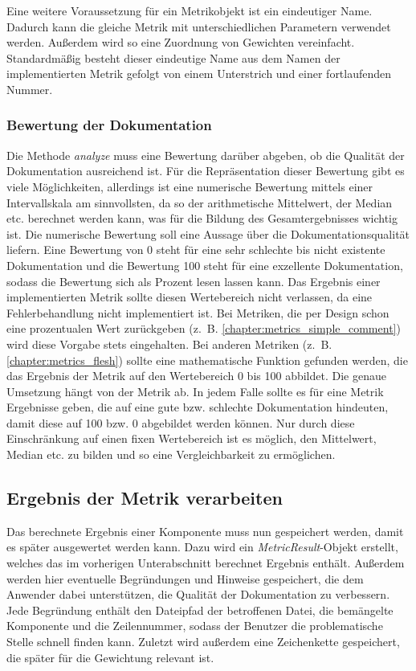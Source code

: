 Eine  weitere Voraussetzung für ein Metrikobjekt ist ein eindeutiger Name. Dadurch kann die gleiche Metrik mit unterschiedlichen Parametern verwendet werden. Außerdem wird so eine Zuordnung von Gewichten vereinfacht. Standardmäßig besteht dieser eindeutige Name aus dem Namen der implementierten Metrik gefolgt von einem Unterstrich und einer fortlaufenden Nummer.
\subsubsection{Bewertung der Dokumentation}
Die Methode \textit{analyze} muss eine Bewertung darüber abgeben, ob die Qualität der Dokumentation ausreichend ist. Für die Repräsentation dieser Bewertung gibt es viele Möglichkeiten, allerdings ist eine numerische Bewertung mittels einer Intervallskala am sinnvollsten, da so der arithmetische Mittelwert, der Median etc. berechnet werden kann, was für die Bildung des Gesamtergebnisses wichtig ist.
Die numerische Bewertung soll eine Aussage über die Dokumentationsqualität liefern. Eine Bewertung von 0 steht für eine sehr schlechte bis nicht existente Dokumentation und die Bewertung 100 steht für eine exzellente Dokumentation, sodass die Bewertung sich als Prozent lesen lassen kann. Das Ergebnis einer implementierten Metrik sollte diesen Wertebereich nicht verlassen, da eine Fehlerbehandlung nicht implementiert ist. Bei Metriken, die per Design schon eine prozentualen Wert zurückgeben (z.~B. \ref{chapter:metrics_simple_comment}) wird diese Vorgabe stets eingehalten. Bei anderen Metriken (z.~B. \ref{chapter:metrics_flesh}) sollte eine mathematische Funktion gefunden werden, die das Ergebnis der Metrik auf den Wertebereich 0 bis 100 abbildet. Die genaue Umsetzung hängt von der Metrik ab. In jedem Falle sollte es für eine Metrik Ergebnisse geben, die auf eine gute bzw. schlechte Dokumentation hindeuten, damit diese auf 100 bzw. 0 abgebildet werden können. Nur durch diese Einschränkung auf einen fixen Wertebereich ist es möglich, den Mittelwert, Median etc. zu bilden und so eine Vergleichbarkeit zu ermöglichen. 

\subsection{Ergebnis der Metrik verarbeiten}

Das berechnete Ergebnis einer Komponente muss nun gespeichert werden, damit es später ausgewertet werden kann. Dazu wird ein \textit{MetricResult}-Objekt erstellt, welches das im vorherigen Unterabschnitt berechnet Ergebnis enthält. Außerdem werden hier eventuelle Begründungen und Hinweise gespeichert, die dem Anwender dabei unterstützen, die Qualität der Dokumentation zu verbessern. Jede Begründung enthält den Dateipfad der betroffenen Datei, die bemängelte Komponente und die Zeilennummer, sodass der Benutzer die problematische Stelle schnell finden kann. Zuletzt wird außerdem eine Zeichenkette gespeichert, die später für die Gewichtung relevant ist. 

